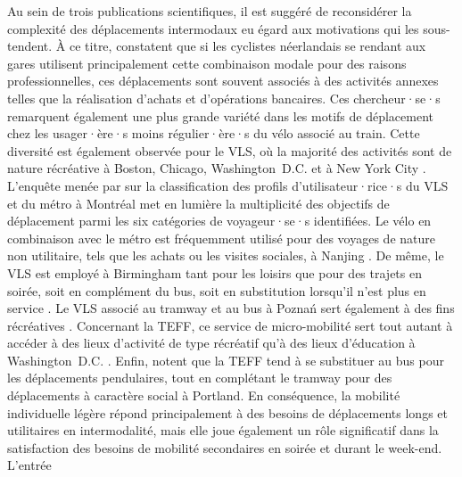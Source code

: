 \begin{refsegment}
Au sein de trois publications scientifiques, il est suggéré de reconsidérer la complexité des déplacements intermodaux eu égard aux motivations qui les sous-tendent. À ce titre, \textcolor{blue}{\textcite[9]{jonkeren_bicycle_2021}} constatent que si les cyclistes néerlandais se rendant aux gares utilisent principalement cette combinaison modale pour des raisons professionnelles, ces déplacements sont souvent associés à des activités annexes telles que la réalisation d'achats et d'opérations bancaires. Ces chercheur·se·s remarquent également une plus grande variété dans les motifs de déplacement chez les usager·ère·s moins régulier·ère·s du vélo associé au train. Cette diversité est également observée pour le \acrshort{VLS}, où la majorité des activités sont de nature récréative à Boston, Chicago, Washington~D.C. et à New York City \textcolor{blue}{\autocite[10]{kong_deciphering_2020}}. L'enquête menée par \textcolor{blue}{\textcite[479]{tarpin-pitre_typology_2020}} sur la classification des profils d'utilisateur·rice·s du \acrshort{VLS} et du métro à Montréal met en lumière la multiplicité des objectifs de déplacement parmi les six catégories de voyageur·se·s identifiées. Le vélo en combinaison avec le métro est fréquemment utilisé pour des voyages de nature non utilitaire, tels que les achats ou les visites sociales, à Nanjing \textcolor{blue}{\autocite[133]{chen_determinants_2012}}. De même, le \acrshort{VLS} est employé à Birmingham tant pour les loisirs que pour des trajets en soirée, soit en complément du bus, soit en substitution lorsqu'il n'est plus en service \textcolor{blue}{\autocite[6]{glass_role_2020}}. Le \acrshort{VLS} associé au tramway et au bus à Poznań sert également à des fins récréatives \textcolor{blue}{\autocite[197]{radzimski_exploring_2021}}. Concernant la \acrshort{TEFF}, ce service de micro-mobilité sert tout autant à accéder à des lieux d'activité de type récréatif qu'à des lieux d'éducation à Washington~D.C. \textcolor{blue}{\autocite[9]{ma_connecting_2022}}. Enfin, \textcolor{blue}{\textcite[411]{mcqueen_assessing_2022}} notent que la \acrshort{TEFF} tend à se substituer au bus pour les déplacements pendulaires, tout en complétant le tramway pour des déplacements à caractère social à Portland. En conséquence, la mobilité individuelle légère répond principalement à des besoins de déplacements longs et utilitaires en intermodalité, mais elle joue également un rôle significatif dans la satisfaction des besoins de mobilité secondaires en soirée et durant le week-end. L'entrée 
\end{refsegment}
